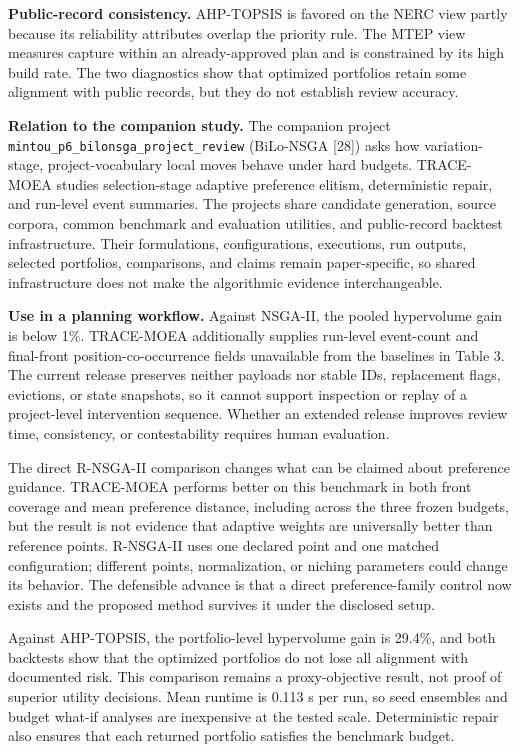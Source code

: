 \documentclass[
  10pt,
  a4paper,
]{article}
\begin{document}
\textbf{Public-record consistency.} AHP-TOPSIS is favored on the NERC
view partly because its reliability attributes overlap the priority
rule. The MTEP view measures capture within an already-approved plan and
is constrained by its high build rate. The two diagnostics show that
optimized portfolios retain some alignment with public records, but they
do not establish review accuracy.

\textbf{Relation to the companion study.} The companion project
\texttt{mintou\_p6\_bilonsga\_project\_review} (BiLo-NSGA {[}28{]}) asks
how variation-stage, project-vocabulary local moves behave under hard
budgets. TRACE-MOEA studies selection-stage adaptive preference elitism,
deterministic repair, and run-level event summaries. The projects share
candidate generation, source corpora, common benchmark and evaluation
utilities, and public-record backtest infrastructure. Their
formulations, configurations, executions, run outputs, selected
portfolios, comparisons, and claims remain paper-specific, so shared
infrastructure does not make the algorithmic evidence interchangeable.

\textbf{Use in a planning workflow.} Against NSGA-II, the pooled
hypervolume gain is below 1\%. TRACE-MOEA additionally supplies
run-level event-count and final-front position-co-occurrence fields
unavailable from the baselines in Table 3. The current release preserves
neither payloads nor stable IDs, replacement flags, evictions, or state
snapshots, so it cannot support inspection or replay of a project-level
intervention sequence. Whether an extended release improves review time,
consistency, or contestability requires human evaluation.

The direct R-NSGA-II comparison changes what can be claimed about
preference guidance. TRACE-MOEA performs better on this benchmark in
both front coverage and mean preference distance, including across the
three frozen budgets, but the result is not evidence that adaptive
weights are universally better than reference points. R-NSGA-II uses one
declared point and one matched configuration; different points,
normalization, or niching parameters could change its behavior. The
defensible advance is that a direct preference-family control now exists
and the proposed method survives it under the disclosed setup.

Against AHP-TOPSIS, the portfolio-level hypervolume gain is 29.4\%, and
both backtests show that the optimized portfolios do not lose all
alignment with documented risk. This comparison remains a
proxy-objective result, not proof of superior utility decisions. Mean
runtime is 0.113 s per run, so seed ensembles and budget what-if
analyses are inexpensive at the tested scale. Deterministic repair also
ensures that each returned portfolio satisfies the benchmark budget.
\end{document}
